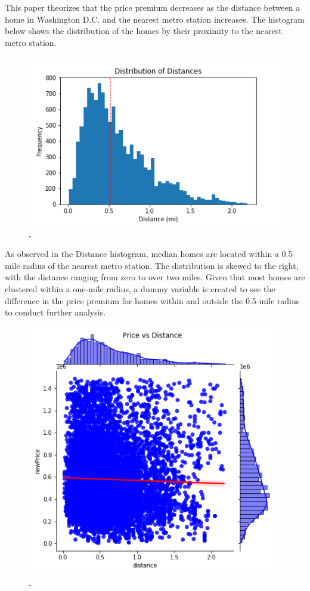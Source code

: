 \documentclass[12pt]{report}
\newcommand\tab[1][.50cm]{\hspace*{#1}}
\begin{document}
\tab This paper theorizes that the price premium decreases as the distance between a home in Washington D.C. and the nearest metro station increases. The histogram below shows the distribution of the homes by their proximity to the nearest metro station.

\begin{figure}[h]
\begin{center}
\includegraphics[width=130mm]{distanceHist.png}
\end{center}
\caption{\textbf{.}}
\label{fig:distanceHist}
\end{figure}
As observed in the Distance histogram, median homes are located within a 0.5-mile radius of the nearest metro station. The distribution is skewed to the right, with the distance ranging from zero to over two miles. Given that most homes are clustered within a one-mile radius, a dummy variable is created to see the difference in the price premium for homes within and outside the 0.5-mile radius to conduct further analysis.
\clearpage

\begin{figure}[h]
\begin{center}
\includegraphics[width=110mm]{DistanceJoint.png}
\end{center}
\caption{\textbf{.}}
\label{fig:distanceJoint}
\end{figure}
\end{document}
